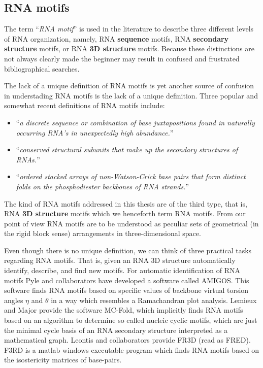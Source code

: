 \subsection{RNA motifs}
The term ``\textit{RNA motif}'' is  used in the literature to describe
three   different   levels    of   RNA   organization,   namely,   RNA
\textbf{sequence} motifs, RNA  \textbf{secondary structure} motifs, or
RNA \textbf{3D structure} motifs.   Because these distinctions are not
always clearly made the beginner may result in confused and frustrated
bibliographical searches.

The lack of a unique definition of RNA motifs is yet another source of
confusion  in  understading  RNA  motifs  is  the  lack  of  a  unique
definition.  Three  popular and  somewhat  recent  definitions of  RNA
motifs include:
\begin{itemize}
\item{``\textit{a discrete sequence or combination of
    base  juxtapositions   found  in  naturally   occurring  RNA's  in
    unexpectedly high abundance.}''\cite{moore1999}}
\item{``\textit{conserved structural subunits that make
    up the secondary structures of RNAs.}''\cite{holbrook2005}}
\item{``\textit{ordered   stacked    arrays   of
    non-Watson-Crick  base  pairs  that  form distinct  folds  on  the
    phosphodiester backbones of RNA strands.}''\cite{leontis2003}}
\end{itemize}

The  kind of RNA  motifs addressed in this
thesis are of the third type, that is, RNA \textbf{3D structure}
motifs  which we henceforth term RNA  motifs.
From our point of view RNA motifs are to be understood as  peculiar
sets of geometrical  (in the rigid block sense)  arrangements in
three-dimensional space.

Even  though there  is no  unique definition,  we can  think  of three
practical  tasks regarding  RNA  motifs.   That is,  given  an RNA  3D
structure automatically identify, describe,  and find new motifs.  For
automatic  identification of  RNA motifs  Pyle and  collaborators have
developed  a software called  AMIGOS. This  software finds  RNA motifs
based on  specific values of backbone virtual  torsion angles $\eta$
and  $\theta$  \cite{yathindra,  olson,  duarte2003} in  a  way  which
resembles   a   Ramachandran  plot   analysis.    Lemieux  and   Major
\cite{lemieux2006}  provide  the  software MC-Fold,  which  implicitly
finds RNA motifs based on  an algorithm to determine so called nucleic
cyclic  motifs, which  are  just the  minimal  cycle basis  of an  RNA
secondary  structure  interpreted as  a  mathematical graph.   Leontis
\cite{nasalean2009}  and collaborators  provide FR3D  (read  as FRED).
F3RD is  a matlab  windows executable program  which finds  RNA motifs
based on the isostericity matrices of base-pairs.


